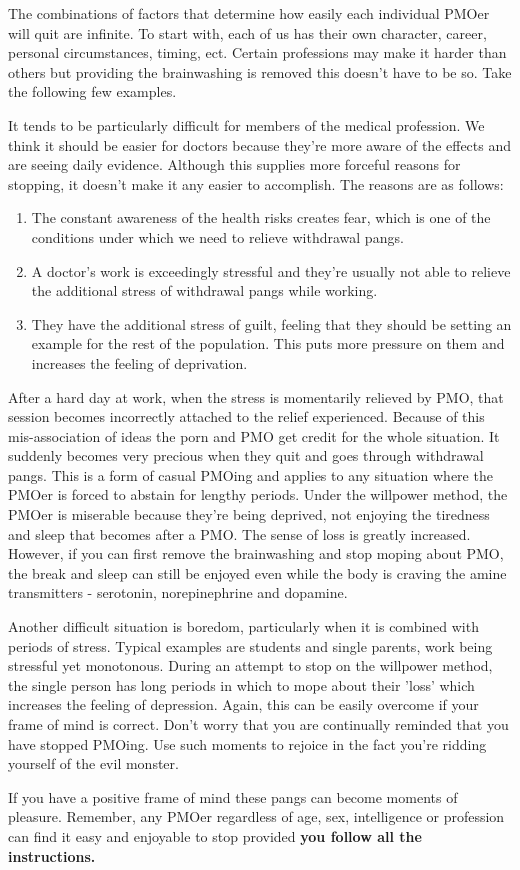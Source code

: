 \documentclass[easypeasy.tex]{subfiles}
\begin{document}
The combinations of factors that determine how easily each individual PMOer will quit are infinite. To start with, each of us has their own character, career, personal circumstances, timing, ect. Certain professions may make it harder than others but providing the brainwashing is removed this doesn't have to be so. Take the following few examples.

It tends to be particularly difficult for members of the medical profession. We think it should be easier for doctors because they're more aware of the effects and are seeing daily evidence. Although this supplies more forceful reasons for stopping, it doesn't make it any easier to accomplish. The reasons are as follows:
  \begin{enumerate}
  \item The constant awareness of the health risks creates fear, which is one of the conditions under which we need to relieve withdrawal pangs.

  \item A doctor's work is exceedingly stressful and they're usually not able to relieve the additional stress of withdrawal pangs while working.

  \item They have the additional stress of guilt, feeling that they should be setting an example for the rest of the population. This puts more pressure on them and increases the feeling of deprivation.
\end{enumerate}
After a hard day at work, when the stress is momentarily relieved by PMO, that session becomes incorrectly attached to the relief experienced. Because of this mis-association of ideas the porn and PMO get credit for the whole situation. It suddenly becomes very precious when they quit and goes through withdrawal pangs. This is a form of casual PMOing and applies to any situation where the PMOer is forced to abstain for lengthy periods. Under the willpower method, the PMOer is miserable because they're being deprived, not enjoying the tiredness and sleep that becomes after a PMO. The sense of loss is greatly increased. However, if you can first remove the brainwashing and stop moping about PMO, the break and sleep can still be enjoyed even while the body is craving the amine transmitters - serotonin, norepinephrine and dopamine.

Another difficult situation is boredom, particularly when it is combined with periods of stress. Typical examples are students and single parents, work being stressful yet monotonous. During an attempt to stop on the willpower method, the single person has long periods in which to mope about their 'loss' which increases the feeling of depression. Again, this can be easily overcome if your frame of mind is correct. Don't worry that you are continually reminded that you have stopped PMOing. Use such moments to rejoice in the fact you're ridding yourself of the evil monster.

If you have a positive frame of mind these pangs can become moments of pleasure. Remember, any PMOer regardless of age, sex, intelligence or profession can find it easy and enjoyable to stop provided \textbf{you follow all the instructions.}
\end{document}
